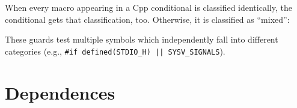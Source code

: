 \documentclass[10pt]{article}
\newcommand{\captionsmall}[1]{\caption[]{\small #1}}
\begin{document}
When every macro appearing in a Cpp conditional is classified identically,
the conditional gets that classification, too.  Otherwise, it is classified
as ``mixed'':

\begin{description}\itemsep 0pt \parskip 0pt
\item[Mixed categories] These guards test multiple symbols
      which independently fall into different categories (e.g.,
      {\tt \#if defined(\verb|STDIO_H|) || \verb|SYSV_SIGNALS|}).
\end{description}



% 
% 
% 



\section{Dependences}
\label{sec:dependence}
\label{sec:last-content-section}
\end{document}
